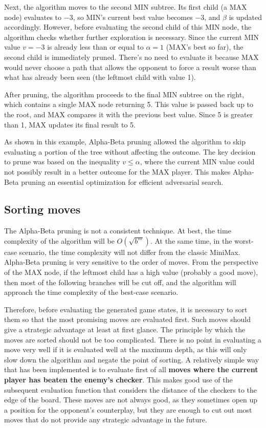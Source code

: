 Next, the algorithm moves to the second MIN subtree. Its first child (a MAX node) evaluates to $-3$, so MIN's current best value becomes $-3$, and $\beta$ is updated accordingly. However, before evaluating the second child of this MIN node, the algorithm checks whether further exploration is necessary. Since the current MIN value $v = -3$ is already less than or equal to $\alpha = 1$ (MAX's best so far), the second child is immediately pruned. There's no need to evaluate it because MAX would never choose a path that allows the opponent to force a result worse than what has already been seen (the leftmost child with value 1).

After pruning, the algorithm proceeds to the final MIN subtree on the right, which contains a single MAX node returning 5. This value is passed back up to the root, and MAX compares it with the previous best value. Since 5 is greater than 1, MAX updates its final result to 5.

As shown in this example, Alpha-Beta pruning allowed the algorithm to skip evaluating a portion of the tree without affecting the outcome. The key decision to prune was based on the inequality $v \leq \alpha$, where the current MIN value could not possibly result in a better outcome for the MAX player. This makes Alpha-Beta pruning an essential optimization for efficient adversarial search. 


\subsection{Sorting moves}
The Alpha-Beta pruning is not a consistent technique. At best, the time complexity of the algorithm will be $O(\sqrt{b^m})$. At the same time, in the worst-case scenario, the time complexity will not differ from the classic MiniMax. Alpha-Beta pruning is very sensitive to the order of moves. From the perspective of the MAX node, if the leftmost child has a high value (probably a good move), then most of the following branches will be cut off, and the algorithm will approach the time complexity of the best-case scenario.

Therefore, before evaluating the generated game states, it is necessary to sort them so that the most promising moves are evaluated first. Such moves should give a strategic advantage at least at first glance. The principle by which the moves are sorted should not be too complicated. There is no point in evaluating a move very well if it is evaluated well at the maximum depth, as this will only slow down the algorithm and negate the point of sorting. A relatively simple way that has been implemented is to evaluate first of all \textbf{moves where the current player has beaten the enemy's checker}. This makes good use of the subsequent evaluation function that considers the distance of the checkers to the edge of the board. These moves are not always good, as they sometimes open up a position for the opponent's counterplay, but they are enough to cut out most moves that do not provide any strategic advantage in the future.

